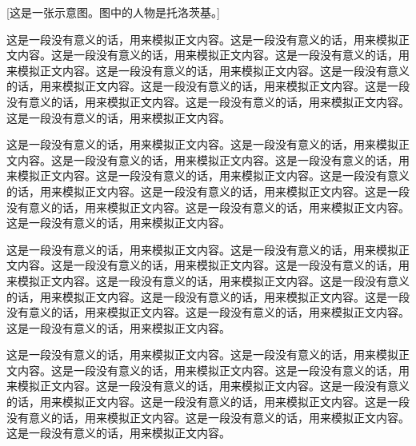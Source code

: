 [这是一张示意图。图中的人物是托洛茨基。]

这是一段没有意义的话，用来模拟正文内容。这是一段没有意义的话，用来模拟正文内容。这是一段没有意义的话，用来模拟正文内容。这是一段没有意义的话，用来模拟正文内容。这是一段没有意义的话，用来模拟正文内容。这是一段没有意义的话，用来模拟正文内容。这是一段没有意义的话，用来模拟正文内容。这是一段没有意义的话，用来模拟正文内容。这是一段没有意义的话，用来模拟正文内容。这是一段没有意义的话，用来模拟正文内容。


这是一段没有意义的话，用来模拟正文内容。这是一段没有意义的话，用来模拟正文内容。这是一段没有意义的话，用来模拟正文内容。这是一段没有意义的话，用来模拟正文内容。这是一段没有意义的话，用来模拟正文内容。这是一段没有意义的话，用来模拟正文内容。这是一段没有意义的话，用来模拟正文内容。这是一段没有意义的话，用来模拟正文内容。这是一段没有意义的话，用来模拟正文内容。这是一段没有意义的话，用来模拟正文内容。

\todo{}

这是一段没有意义的话，用来模拟正文内容。这是一段没有意义的话，用来模拟正文内容。这是一段没有意义的话，用来模拟正文内容。这是一段没有意义的话，用来模拟正文内容。这是一段没有意义的话，用来模拟正文内容。这是一段没有意义的话，用来模拟正文内容。这是一段没有意义的话，用来模拟正文内容。这是一段没有意义的话，用来模拟正文内容。这是一段没有意义的话，用来模拟正文内容。这是一段没有意义的话，用来模拟正文内容。

这是一段没有意义的话，用来模拟正文内容。这是一段没有意义的话，用来模拟正文内容。这是一段没有意义的话，用来模拟正文内容。这是一段没有意义的话，用来模拟正文内容。这是一段没有意义的话，用来模拟正文内容。这是一段没有意义的话，用来模拟正文内容。这是一段没有意义的话，用来模拟正文内容。这是一段没有意义的话，用来模拟正文内容。这是一段没有意义的话，用来模拟正文内容。这是一段没有意义的话，用来模拟正文内容。


